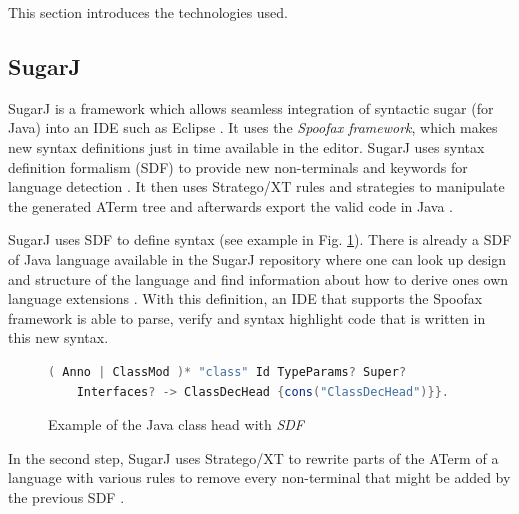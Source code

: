 \documentclass{report}
\begin{document}
This section introduces the technologies used.

\subsection{SugarJ}

SugarJ is a framework which allows seamless integration of syntactic sugar (for Java) into an IDE such as Eclipse \cite{Erdweg-SugarJ-2011}. It uses the \emph{Spoofax framework}, which makes new syntax definitions just in time available in the editor. SugarJ uses syntax definition formalism (SDF) to provide new non-terminals and keywords for language detection \cite{Heering-SDF-1989}. It then uses Stratego/XT rules and strategies to manipulate the generated ATerm tree and afterwards export the valid code in Java \cite{Kats-Spoofax-2010, Brand-ATerms-2000}.

SugarJ uses SDF to define syntax (see example in Fig. \ref{exampleSDFJavaClassDecHead}). There is already a SDF of Java language available in the SugarJ repository where one can look up design and structure of the language and find information about how to derive ones own language extensions \cite{Heering-SDF-1989, Brand-SDF-2007, Java-SDF-2014}. With this definition, an IDE that supports the Spoofax framework is able to parse, verify and syntax highlight code that is written in this new syntax.

\begin{figure}[H]
\begin{lstlisting}[language=java,breaklines=false]
( Anno | ClassMod )* "class" Id TypeParams? Super? 
    Interfaces? -> ClassDecHead {cons("ClassDecHead")}}.
\end{lstlisting}
\caption{Example of the Java class head with \emph{SDF} \cite{Java-SDF-2014}}
\label{exampleSDFJavaClassDecHead}
\end{figure}

In the second step, SugarJ uses Stratego/XT to rewrite parts of the ATerm of a language with various rules to remove every non-terminal that might be added by the previous SDF \cite{Stratego-Manual, Kats-Spoofax-2010, Brand-ATerms-2000, Visser-Stratego-2003}.
\end{document}

